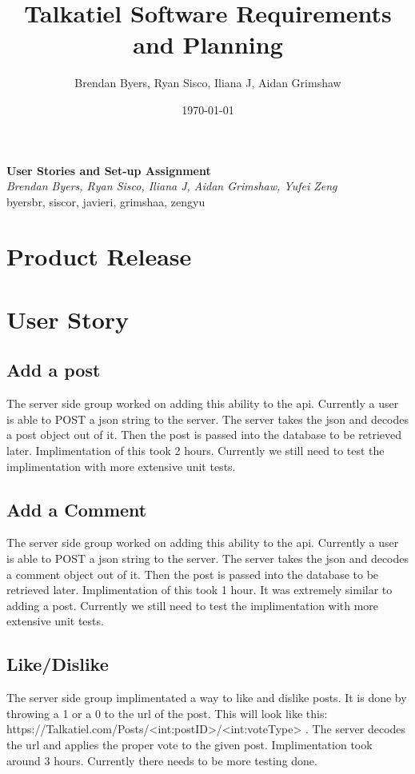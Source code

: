 \documentclass[12pt]{article}
\title{Talkatiel Software Requirements and Planning}
\author{Brendan Byers, Ryan Sisco, Iliana J, Aidan Grimshaw}
\date{\today}
\begin{document}
\begin{center}
      \Large\textbf{User Stories and Set-up Assignment}\\
      \large\textit{Brendan Byers, Ryan Sisco, Iliana J, Aidan Grimshaw, Yufei Zeng}\\
      \large{byersbr, siscor, javieri, grimshaa, zengyu}\\
   \end{center}

\tableofcontents
\section{Product Release}
\section{User Story}
      \subsection{Add a post}
      The server side group worked on adding this ability to the api.  Currently a user is able to POST a json string to the server.  The server takes the json and decodes a post object out of it.  Then the post is passed into the database to be retrieved later.  Implimentation of this took 2 hours.  Currently we still need to test the implimentation with more extensive unit tests.      
      \subsection{Add a Comment}
      The server side group worked on adding this ability to the api.  Currently a user is able to POST a json string to the server.  The server takes the json and decodes a comment object out of it.  Then the post is passed into the database to be retrieved later.  Implimentation of this took 1 hour.  It was extremely similar to adding a post.  Currently we still need to test the implimentation with more extensive unit tests.
      \subsection{Like/Dislike}
      The server side group implimentated a way to like and dislike posts.  It is done by throwing a 1 or a 0 to the url of the post.  This will look like this: https://Talkatiel.com/Posts/<int:postID>/<int:voteType> .  The server decodes the url and applies the proper vote to the given post.  Implimentation took around 3 hours.  Currently there needs to be more testing done.
\end{document}
